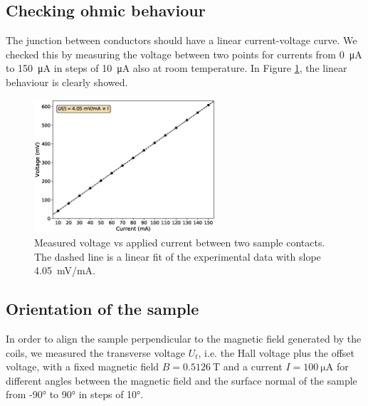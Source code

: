 \documentclass[11pt,a4paper]{article}
\begin{document}
\subsection{Checking ohmic behaviour}

The junction between conductors should have a linear current-voltage curve. We checked this by measuring the voltage between two points for currents from \SI{0}{\micro\ampere} to \SI{150}{\micro\ampere} in steps of \SI{10}{\micro\ampere} also at room temperature. In Figure \ref{fig:ohmic_check}, the linear behaviour is clearly showed.

\begin{figure}[H]
\centering
\includegraphics[width=0.6\textwidth]{Voltage_vs_current_ohmic_test.eps}
\caption{Measured voltage vs applied current between two sample contacts. The dashed line is a linear fit of the experimental data with slope \SI{4.05}{\milli\volt/\milli\ampere}.}
\label{fig:ohmic_check}
\end{figure}

\subsection{Orientation of the sample}

In order to align the sample perpendicular to the magnetic field generated by the coils, we measured the transverse voltage $U_t$, i.e. the Hall voltage plus the offset voltage, with a fixed magnetic field $B=\SI{0.5126}{\tesla}$ and a current $I=\SI{100}{\micro\ampere}$ for different angles between the magnetic field and the surface normal of the sample from \ang{-90} to \ang{90} in steps of \ang{10}.
\end{document}
